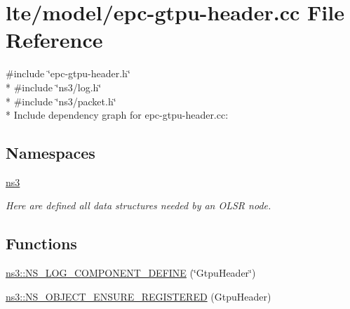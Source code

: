 \hypertarget{epc-gtpu-header_8cc}{}\section{lte/model/epc-\/gtpu-\/header.cc File Reference}
\label{epc-gtpu-header_8cc}
{\ttfamily \#include \char`\"{}epc-\/gtpu-\/header.\+h\char`\"{}}\\*
{\ttfamily \#include \char`\"{}ns3/log.\+h\char`\"{}}\\*
{\ttfamily \#include \char`\"{}ns3/packet.\+h\char`\"{}}\\*
Include dependency graph for epc-\/gtpu-\/header.cc\+:
\subsection*{Namespaces}
\begin{DoxyCompactItemize}
\item 
 \hyperlink{namespacens3}{ns3}
\begin{DoxyCompactList}\small\item\em Here are defined all data structures needed by an O\+L\+SR node. \end{DoxyCompactList}\end{DoxyCompactItemize}
\subsection*{Functions}
\begin{DoxyCompactItemize}
\item 
\hyperlink{namespacens3_a4c13d4dabf368c9d32e20a8bc3dd4121}{ns3\+::\+N\+S\+\_\+\+L\+O\+G\+\_\+\+C\+O\+M\+P\+O\+N\+E\+N\+T\+\_\+\+D\+E\+F\+I\+NE} (\char`\"{}Gtpu\+Header\char`\"{})
\item 
\hyperlink{namespacens3_ac0777de0905e35e0817c9cb1af01215d}{ns3\+::\+N\+S\+\_\+\+O\+B\+J\+E\+C\+T\+\_\+\+E\+N\+S\+U\+R\+E\+\_\+\+R\+E\+G\+I\+S\+T\+E\+R\+ED} (Gtpu\+Header)
\end{DoxyCompactItemize}
